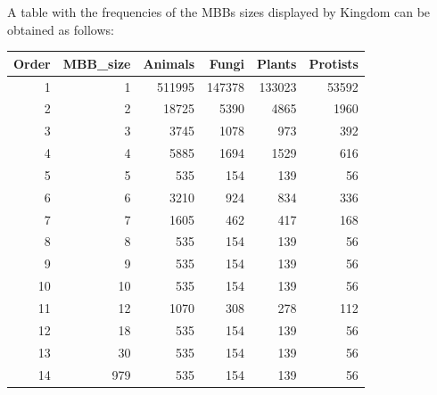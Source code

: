 \documentclass[
  letterpaper,
  DIV=11,
  numbers=noendperiod]{scrreprt}
\newenvironment{Shaded}{}{}
\newcommand{\AttributeTok}[1]{\textcolor[rgb]{0.78,0.47,0.87}{#1}}
\newcommand{\DecValTok}[1]{\textcolor[rgb]{0.82,0.60,0.40}{#1}}
\newcommand{\FunctionTok}[1]{\textcolor[rgb]{0.38,0.69,0.94}{#1}}
\newcommand{\NormalTok}[1]{\textcolor[rgb]{0.67,0.70,0.75}{#1}}
\newcommand{\OtherTok}[1]{\textcolor[rgb]{0.15,0.68,0.38}{#1}}
\newcommand{\SpecialCharTok}[1]{\textcolor[rgb]{0.34,0.71,0.76}{#1}}
\begin{document}
A table with the frequencies of the MBBs sizes displayed by Kingdom can
be obtained as follows:

\begin{Shaded}
\end{Shaded}

\begin{tabular}{r|r|r|r|r|r}
\hline
Order & MBB\_size & Animals & Fungi & Plants & Protists\\
\hline
1 & 1 & 511995 & 147378 & 133023 & 53592\\
\hline
2 & 2 & 18725 & 5390 & 4865 & 1960\\
\hline
3 & 3 & 3745 & 1078 & 973 & 392\\
\hline
4 & 4 & 5885 & 1694 & 1529 & 616\\
\hline
5 & 5 & 535 & 154 & 139 & 56\\
\hline
6 & 6 & 3210 & 924 & 834 & 336\\
\hline
7 & 7 & 1605 & 462 & 417 & 168\\
\hline
8 & 8 & 535 & 154 & 139 & 56\\
\hline
9 & 9 & 535 & 154 & 139 & 56\\
\hline
10 & 10 & 535 & 154 & 139 & 56\\
\hline
11 & 12 & 1070 & 308 & 278 & 112\\
\hline
12 & 18 & 535 & 154 & 139 & 56\\
\hline
13 & 30 & 535 & 154 & 139 & 56\\
\hline
14 & 979 & 535 & 154 & 139 & 56\\
\hline
\end{tabular}
\end{document}

